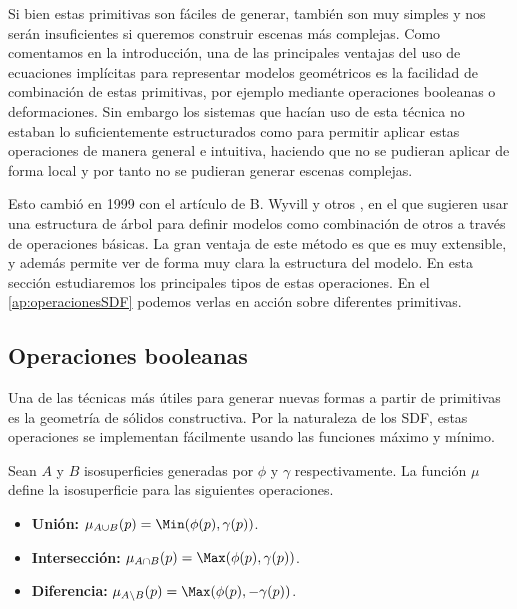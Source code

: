 
Si bien estas primitivas son fáciles de generar, también son muy simples y nos serán insuficientes si queremos construir escenas más complejas. Como comentamos en la introducción, una de las principales ventajas del uso de ecuaciones implícitas para representar modelos geométricos es la facilidad de combinación de estas primitivas, por ejemplo mediante operaciones booleanas o deformaciones. Sin embargo los sistemas que hacían uso de esta técnica no estaban lo suficientemente estructurados como para permitir aplicar estas operaciones de manera general e intuitiva, haciendo que no se pudieran aplicar de forma local y por tanto no se pudieran generar escenas complejas.\newline


Esto cambió en 1999 con el artículo de B. Wyvill y otros \cite{blobtree}, en el que sugieren usar una estructura de árbol para definir modelos como combinación de otros a través de operaciones básicas. La gran ventaja de este método es que es muy extensible, y además permite ver de forma muy clara la estructura del modelo. En esta sección estudiaremos los principales tipos de estas operaciones. En el \autoref{ap:operacionesSDF} podemos verlas en acción sobre diferentes primitivas.

\subsection{Operaciones booleanas}
Una de las técnicas más útiles para generar nuevas formas a partir de primitivas es la geometría de sólidos constructiva. Por la naturaleza de los SDF, estas operaciones se implementan fácilmente usando las funciones máximo y mínimo.

\begin{definicion}\label{p:boolean}
    Sean $A$ y $B$ isosuperficies generadas por $\phi$ y $\gamma$ respectivamente. La función $\mu$ define la isosuperficie para las siguientes operaciones.
    \begin{itemize}
        \item \textbf{Unión: } $\mu_{A\cup B}(p) = \Min(\phi(p), \gamma(p))$.
        \item \textbf{Intersección: } $\mu_{A\cap B}(p) = \Max(\phi(p), \gamma(p))$.
        \item \textbf{Diferencia: } $\mu_{A\setminus B}(p) = \Max(\phi(p), -\gamma(p))$.
    \end{itemize}
\end{definicion}

